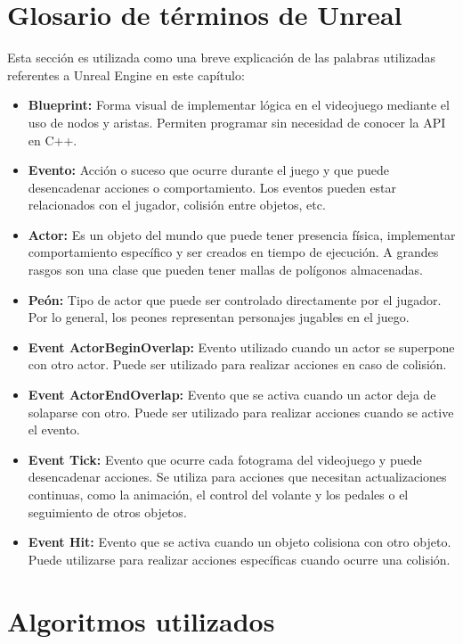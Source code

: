 \section{Glosario de términos de Unreal}
\label{sec:terminosunreal}
Esta sección es utilizada como una breve explicación de las palabras utilizadas referentes a Unreal Engine en este capítulo:

\begin{itemize}
    \item \textbf{Blueprint: }Forma visual de implementar lógica en el videojuego mediante el uso de nodos y aristas. Permiten programar sin necesidad de conocer la API en C++.
    \item \textbf{Evento: }Acción o suceso que ocurre durante el juego y que puede desencadenar acciones o comportamiento. Los eventos pueden estar relacionados con el jugador, colisión entre objetos, etc.
    \item \textbf{Actor: }Es un objeto del mundo que puede tener presencia física, implementar comportamiento específico y ser creados en tiempo de ejecución. A grandes rasgos son una clase que pueden tener mallas de polígonos almacenadas.
    \item \textbf{Peón: }Tipo de actor que puede ser controlado directamente por el jugador. Por lo general, los peones representan personajes jugables en el juego.
    \item \textbf{Event ActorBeginOverlap: }Evento utilizado cuando un actor se superpone con otro actor. Puede ser utilizado para realizar acciones en caso de colisión.
    \item \textbf{Event ActorEndOverlap: }Evento que se activa cuando un actor deja de solaparse con otro. Puede ser utilizado para realizar acciones cuando se active el evento.
    \item \textbf{Event Tick: }Evento que ocurre cada fotograma del videojuego y puede desencadenar acciones. Se utiliza para acciones que necesitan actualizaciones continuas, como la animación, el control del volante y los pedales o el seguimiento de otros objetos.
    \item \textbf{Event Hit: }Evento que se activa cuando un objeto colisiona con otro objeto. Puede utilizarse para realizar acciones específicas cuando ocurre una colisión.
\end{itemize}

\section{Algoritmos utilizados}

